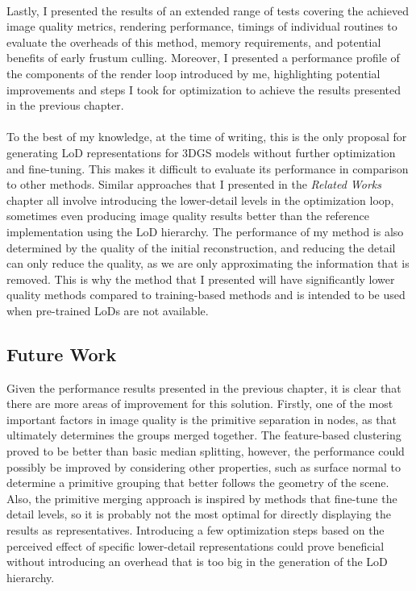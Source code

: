 \paragraph{}

Lastly, I presented the results of an extended range of tests covering the achieved image quality metrics, rendering performance, timings of individual routines to evaluate the overheads of this method, memory requirements, and potential benefits of early frustum culling. Moreover, I presented a performance profile of the components of the render loop introduced by me, highlighting potential improvements and steps I took for optimization to achieve the results presented in the previous chapter.
\paragraph{}

To the best of my knowledge, at the time of writing, this is the only proposal for generating LoD representations for 3DGS models without further optimization and fine-tuning. This makes it difficult to evaluate its performance in comparison to other methods. Similar approaches that I presented in the \textit{Related Works} chapter all involve introducing the lower-detail levels in the optimization loop, sometimes even producing image quality results better than the reference implementation using the LoD hierarchy. The performance of my method is also determined by the quality of the initial reconstruction, and reducing the detail can only reduce the quality, as we are only approximating the information that is removed. This is why the method that I presented will have significantly lower quality methods compared to training-based methods and is intended to be used when pre-trained LoDs are not available. 

\subsection{Future Work}
Given the performance results presented in the previous chapter, it is clear that there are more areas of improvement for this solution. Firstly, one of the most important factors in image quality is the primitive separation in nodes, as that ultimately determines the groups merged together. The feature-based clustering proved to be better than basic median splitting, however, the performance could possibly be improved by considering other properties, such as surface normal to determine a primitive grouping that better follows the geometry of the scene. Also, the primitive merging approach is inspired by methods that fine-tune the detail levels, so it is probably not the most optimal for directly displaying the results as representatives. Introducing a few optimization steps based on the perceived effect of specific lower-detail representations could prove beneficial without introducing an overhead that is too big in the generation of the LoD hierarchy.
